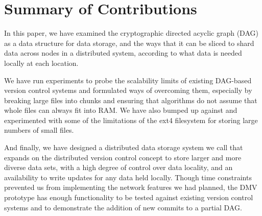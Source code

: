 \chapter{Summary of Contributions}

In this paper, we have examined the cryptographic directed acyclic graph (DAG)
as a data structure for data storage, and the ways that it can be sliced to
shard data across nodes in a distributed system, according to what data is
needed locally at each location.

We have run experiments to probe the scalability limits of existing DAG-based
version control systems and formulated ways of overcoming them, especially by
breaking large files into chunks and ensuring that algorithms do not assume that
whole files can always fit into RAM. We have also bumped up against and
experimented with some of the limitations of the ext4 filesystem for storing
large numbers of small files.

And finally, we have designed a distributed data storage system we call
 that expands on the distributed
version control concept to store larger and more diverse data sets, with a high
degree of control over data locality, and an availability to write updates for
any data held locally. Though time constraints prevented us from implementing
the network features we had planned, the DMV prototype has enough functionality
to be tested against existing version control systems and to demonstrate the
addition of new commits to a partial DAG.
